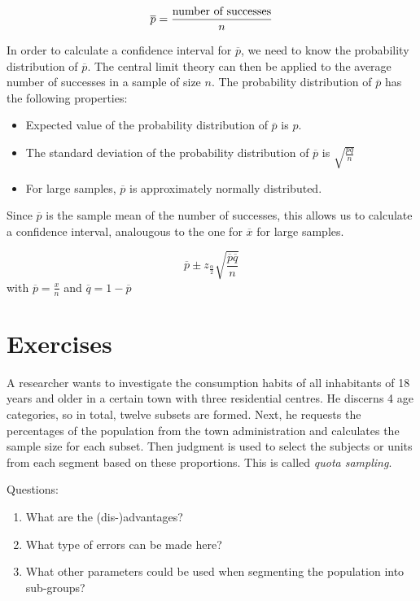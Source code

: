 \[ \overline{p} = \frac{\textnormal{number of successes}}{n} \]

In order to calculate a confidence interval for $\overline{p}$, we need to know the probability distribution of $\overline{p}$. The central limit theory can then be applied to the average number of successes in a sample of size $n$. The probability distribution of $\overline{p}$ has the following properties:

\begin{itemize}
  \item Expected value of the probability distribution of  $\overline{p}$ is $p$.
  \item The standard deviation of the probability distribution of $\overline{p}$ is $\sqrt{\frac{pq}{n}}$
  \item For large samples, $\overline{p}$ is approximately normally distributed.
\end{itemize}

Since $\overline{p}$ is the sample mean of the number of successes, this allows us to calculate a confidence interval, analougous to the one for $\overline{x}$ for large samples.

\begin{definition}
  \[ \overline{p} \pm z_{\frac{\alpha}{2}} \sqrt{\frac{\overline{p}\overline{q}}{n}} \]
  with $\overline{p} = \frac{x}{n}$ and $\overline{q} = 1- \overline{p}$
\end{definition}

\section{Exercises}
\label{sec:sampling-exercises}

\begin{exercise}
  A researcher wants to investigate the consumption habits of all inhabitants of 18 years and older in a certain town with three residential centres. He discerns 4 age categories, so in total, twelve subsets are formed. Next, he requests the percentages of the population from the town administration and calculates the sample size for each subset. Then judgment is used to select the subjects or units from each segment based on these proportions. This is called \emph{quota sampling}.
  
  Questions:
  \begin{enumerate}[label=\alph*.]
    \item What are the (dis-)advantages?
    \item What type of errors can be made here?
    \item What other parameters could be used when segmenting the population into sub-groups?
  \end{enumerate}
\end{exercise}

